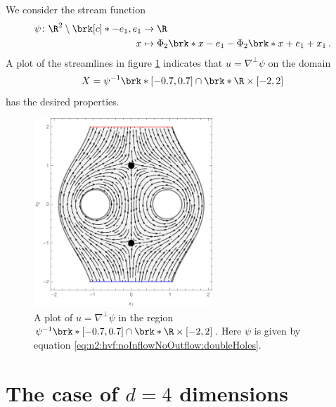 \begin{example}
  We consider the stream function
  \begin{equation}
    \begin{aligned}
    \psi\colon\R^2\setminus\brk[c]*{-e_1,e_1}&\to\R \\
    x&\mapsto\Phi_2\brk*{x-e_1}-\Phi_2\brk*{x+e_1}+x_1\,.
    \end{aligned}\label{eq:n2:hvf:noInflowNoOutflow:doubleHoles}
  \end{equation}
  A plot of the streamlines in figure \ref{pl:n2_hvf_InflowOutflow_symmetric_region} indicates that $u=\nabla^\perp\psi$ 
  on the domain
  $$X=\psi^{-1}\brk*{[-0.7,0.7]}\cap \brk*{\R\times[-2,2]}$$
  has the desired properties.
  \begin{figure}
    \centering
    \includegraphics[width=0.6\textwidth]{../Plots/n2_hvf_InflowOutflow_symmetric_gray_2.pdf}
    \caption{A plot of $u=\nabla^\perp\psi$ in the region $\psi^{-1}\brk*{[-0.7,0.7]}\cap \brk*{\R\times[-2,2]}$.
    Here $\psi$ is given by equation \eqref{eq:n2:hvf:noInflowNoOutflow:doubleHoles}.}
    \label{pl:n2_hvf_InflowOutflow_symmetric_region}
  \end{figure}
\end{example}

\section{The case of $d=4$ dimensions}

